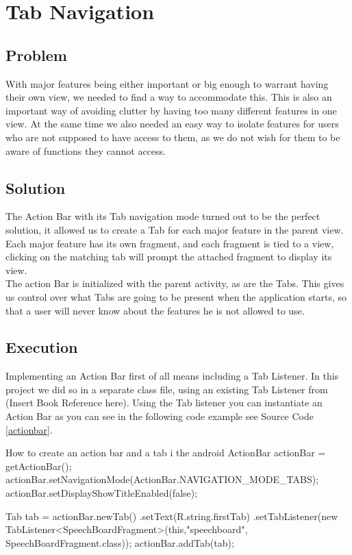 \section{Tab Navigation} %
\subsection*{Problem}
With major features being either important or big enough to warrant having their own view, we needed to find a way to accommodate this.
This is also an important way of avoiding clutter by having too many different features in one view.
At the same time we also needed an easy way to isolate features for users who are not supposed to have access to them, as we do not wish for them to be aware of functions they cannot access.

\subsection*{Solution}
The Action Bar with its Tab navigation mode turned out to be the perfect solution, it allowed us to create a Tab for each major feature in the parent view.
Each major feature has its own fragment, and each fragment is tied to a view, clicking on the matching tab will prompt the attached fragment to display its view.\\
The action Bar is initialized with the parent activity, as are the Tabs.
This gives us control over what Tabs are going to be present when the application starts, so that a user will never know about the features he is not allowed to use.

\subsection*{Execution}
Implementing an Action Bar first of all means including a Tab Listener.
In this project we did so in a separate class file, using an existing Tab Listener from (Insert Book Reference here).
Using the Tab listener you can instantiate an Action Bar as you can see in the following code example see Source Code \ref{actionbar}.

\begin{source}[{actionbar}]{How to create an action bar and a tab i the android}
ActionBar actionBar = getActionBar();
actionBar.setNavigationMode(ActionBar.NAVIGATION_MODE_TABS); 
actionBar.setDisplayShowTitleEnabled(false);

Tab tab = actionBar.newTab()
		.setText(R.string.firstTab) 
		.setTabListener(new TabListener<SpeechBoardFragment>(this,"speechboard", SpeechBoardFragment.class));
actionBar.addTab(tab);
\end{source}

